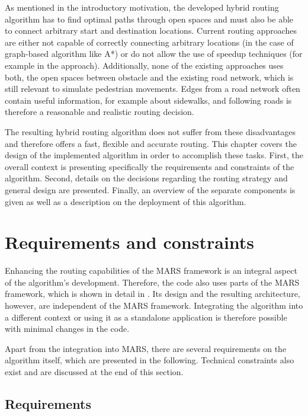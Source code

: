 
As mentioned in the introductory motivation, the developed hybrid routing algorithm has to find optimal paths through open spaces and must also be able to connect arbitrary start and destination locations.
Current routing approaches are either not capable of correctly connecting arbitrary locations (in the case of graph-based algorithm like A*) or do not allow the use of speedup techniques (for example in the  approach).
Additionally, none of the existing approaches uses both, the open spaces between obstacle and the existing road network, which is still relevant to simulate pedestrian movements.
Edges from a road network often contain useful information, for example about sidewalks, and following roads is therefore a reasonable and realistic routing decision.

The resulting hybrid routing algorithm does not suffer from these disadvantages and therefore offers a fast, flexible and accurate routing.
This chapter covers the design of the implemented algorithm in order to accomplish these tasks.
First, the overall context is presenting specifically the requirements and constraints of the algorithm.
Second, details on the decisions regarding the routing strategy and general design are presented.
Finally, an overview of the separate components is given as well as a description on the deployment of this algorithm.

\section{Requirements and constraints}
	
	Enhancing the routing capabilities of the MARS framework is an integral aspect of the algorithm's development.
	Therefore, the code also uses parts of the MARS framework, which is shown in detail in .
	Its design and the resulting architecture, however, are independent of the MARS framework.
	Integrating the algorithm into a different context or using it as a standalone application is therefore possible with minimal changes in the code.
	
	Apart from the integration into MARS, there are several requirements on the algorithm itself, which are presented in the following.
	Technical constraints also exist and are discussed at the end of this section.
	
	\subsection{Requirements}
	
